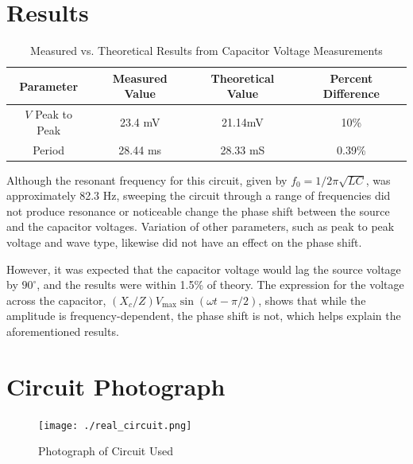 \documentclass[twocolumn,english]{IEEEtran}
\theoremstyle{plain}
\theoremstyle{plain}
\begin{document}
\section{Results}
\begin{table}[h!]
\centering{}
\caption{Measured vs. Theoretical Results from Capacitor Voltage Measurements}
\label{tb:meas_err}
\begin{tabular}{|c|c|c|c|}
\hline
\textbf{Parameter}	&\textbf{Measured Value}		&\textbf{Theoretical Value}	&\textbf{Percent Difference}	\\ \hline
$V$ Peak to Peak	&23.4 mV				&21.14mV 			&10\%				\\ \hline
Period			&28.44 ms				&28.33 mS  			&0.39\% 			\\ \hline
\end{tabular}
\end{table}

Although the resonant frequency for this circuit, given by $f_0 = 1/2\pi\sqrt{LC}$, was approximately 82.3 Hz, sweeping the circuit through a range of frequencies did not produce resonance or noticeable change the phase shift between the source and the capacitor voltages. Variation of other parameters, such as peak to peak voltage and wave type, likewise did not have an effect on the phase shift.

However, it was expected that the capacitor voltage would lag the source voltage by $90^{\circ}$, and the results were within 1.5\% of theory. The expression for the voltage across the capacitor, $(X_c/Z)V_{\text{max}}\sin(\omega t- \pi/2)$, shows that while the amplitude is frequency-dependent, the phase shift is not, which helps explain the aforementioned results.

\appendices{}

\section{Circuit Photograph}\label{append:deriv}

\begin{figure}[h!]
  \begin{centering}
  \begin{center}
  \texttt{[image: ./real\_circuit.png]}
  \label{fig:real_circuit}
  \caption{Photograph of Circuit Used}
  \end{center}
  \par\end{centering}
  \end{figure}

%
%
\end{document}
